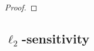 \documentclass[11pt]{scrartcl} %
\begin{document}
\begin{proof}
 \end{proof}

\subsection{$\ell_2$-sensitivity}



\end{document}
